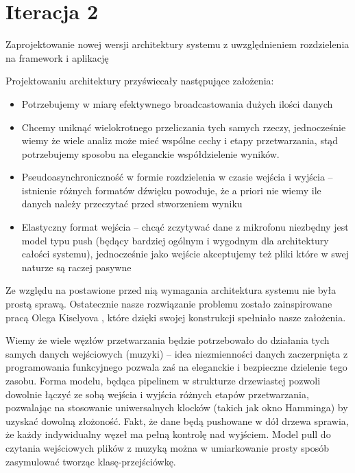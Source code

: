 \section{Iteracja 2}
\begin{Note}


Zaprojektowanie nowej wersji architektury systemu z uwzględnieniem rozdzielenia na framework i aplikację


Projektowaniu architektury przyświecały następujące założenia:
\begin{itemize}

    \item Potrzebujemy w miarę efektywnego broadcastowania dużych ilości danych
    \item Chcemy uniknąć wielokrotnego przeliczania tych samych rzeczy, jednocześnie wiemy że wiele analiz może mieć wspólne cechy i etapy przetwarzania, stąd potrzebujemy sposobu na eleganckie współdzielenie wyników.
    \item Pseudoasynchroniczność w formie rozdzielenia w czasie wejścia i wyjścia -- istnienie różnych formatów dźwięku powoduje, że a priori nie wiemy ile danych należy przeczytać przed stworzeniem wyniku
    \item Elastyczny format wejścia -- chcąć zczytywać dane z mikrofonu niezbędny jest model typu push (będący bardziej ogólnym i wygodnym dla architektury całości systemu), jednocześnie jako wejście akceptujemy też pliki które w swej naturze są raczej pasywne

\end{itemize}

Ze względu na postawione przed nią wymagania architektura systemu nie była prostą sprawą.
Ostatecznie nasze rozwiązanie problemu zostało zainspirowane pracą Olega Kiselyova \cite{kiselyov}, które dzięki swojej konstrukcji spełniało nasze założenia.

Wiemy że wiele węzłów przetwarzania będzie potrzebowało do działania tych samych danych wejściowych
(muzyki) -- idea niezmienności danych zaczerpnięta z programowania funkcyjnego pozwala zaś na eleganckie i bezpieczne dzielenie tego zasobu. Forma modelu, będąca pipelinem w strukturze drzewiastej pozwoli dowolnie łączyć ze sobą wejścia i wyjścia różnych etapów przetwarzania, pozwalając na stosowanie uniwersalnych klocków (takich jak okno Hamminga) by uzyskać dowolną złożoność. Fakt, że dane będą pushowane w dół drzewa sprawia, że każdy indywidualny węzeł ma pełną kontrolę nad wyjściem. Model pull do czytania wejściowych plików z muzyką można w umiarkowanie prosty sposób zasymulować tworząc klasę-przejściówkę.


\end{Note}
